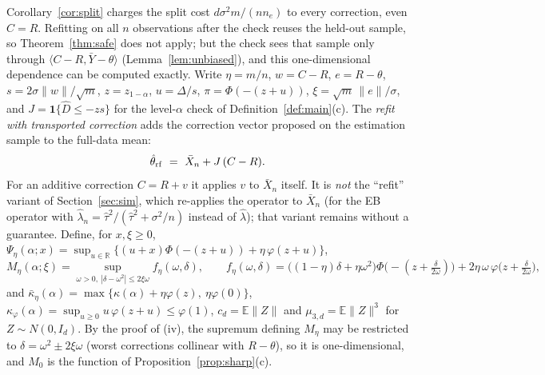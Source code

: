 \documentclass[10pt,a4paper]{article}
\theoremstyle{plain}
\theoremstyle{definition}
\theoremstyle{remark}
\newcommand{\R}{\mathbb{R}}
\newcommand{\E}{\mathbb{E}}
\newcommand{\Dh}{\widehat{D}}
\newcommand{\Ybar}{\bar{Y}}
\newcommand{\norm}[1]{\lVert #1\rVert}
\newcommand{\ip}[1]{\langle #1\rangle}
\begin{document}
Corollary~\ref{cor:split} charges the split cost $d\sigma^2m/(nn_e)$ to every correction, even $C=R$. Refitting on all $n$ observations after the check reuses the held-out sample, so Theorem~\ref{thm:safe} does not apply; but the check sees that sample only through $\ip{C-R,\Ybar-\theta}$ (Lemma~\ref{lem:unbiased}), and this one-dimensional dependence can be computed exactly. Write $\eta=m/n$, $w=C-R$, $e=R-\theta$, $s=2\sigma\norm w/\sqrt m$, $z=z_{1-\alpha}$, $u=\Delta/s$, $\pi=\Phi(-(z+u))$, $\xi=\sqrt m\,\norm e/\sigma$, and $J=\mathbf 1\{\Dh\le-zs\}$ for the level-$\alpha$ check of Definition~\ref{def:main}(c). The \emph{refit with transported correction} adds the correction vector proposed on the estimation sample to the full-data mean:
\[
\hat\theta_{\rm rf}\ =\ \bar X_n+J\,(C-R).
\]
For an additive correction $C=R+v$ it applies $v$ to $\bar X_n$ itself. It is \emph{not} the ``refit'' variant of Section~\ref{sec:sim}, which re-applies the operator to $\bar X_n$ (for the EB operator with $\hat\lambda_n=\hat\tau^2/(\hat\tau^2+\sigma^2/n)$ instead of $\hat\lambda$); that variant remains without a guarantee. Define, for $x,\xi\ge0$, $\Psi_\eta(\alpha;x)=\sup_{u\in\R}\{(u+x)\Phi(-(z+u))+\eta\,\varphi(z+u)\}$,
\[
M_\eta(\alpha;\xi)=\sup_{\omega>0,\ |\delta-\omega^2|\le2\xi\omega} f_\eta(\omega,\delta),\qquad
f_\eta(\omega,\delta)=\big((1-\eta)\delta+\eta\omega^2\big)\Phi\big(-(z+\tfrac{\delta}{2\omega})\big)+2\eta\,\omega\,\varphi\big(z+\tfrac{\delta}{2\omega}\big),
\]
and $\bar\kappa_\eta(\alpha)=\max\{\kappa(\alpha)+\eta\varphi(z),\ \eta\varphi(0)\}$, $\kappa_\varphi(\alpha)=\sup_{u\ge0}u\,\varphi(z+u)\le\varphi(1)$, $c_d=\E\norm Z$ and $\mu_{3,d}=\E\norm Z^3$ for $Z\sim N(0,I_d)$. By the proof of (iv), the supremum defining $M_\eta$ may be restricted to $\delta=\omega^2\pm2\xi\omega$ (worst corrections collinear with $R-\theta$), so it is one-dimensional, and $M_0$ is the function of Proposition~\ref{prop:sharp}(c).
\end{document}
